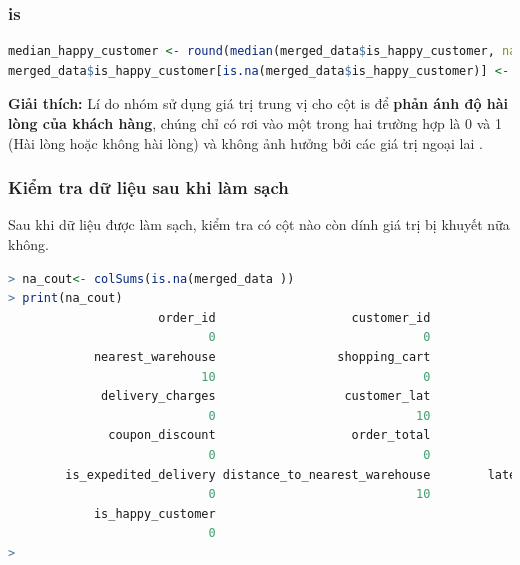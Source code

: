 \subsubsection{is}
\begin{lstlisting}[language=R, caption=Làm tròn trung vị]
median_happy_customer <- round(median(merged_data$is_happy_customer, na.rm = TRUE), digits = 0)
merged_data$is_happy_customer[is.na(merged_data$is_happy_customer)] <- median_happy_customer
\end{lstlisting}
\begin{boxH} 
\textbf{Giải thích:}
    Lí do nhóm sử dụng giá trị trung vị cho cột 
is để \textbf{phản ánh độ hài lòng của khách hàng}, chúng chỉ có rơi vào một trong hai trường hợp là 0 và 1 (Hài lòng hoặc không hài lòng) và không ảnh hưởng bởi các giá trị ngoại lai .
\end{boxH}
\subsubsection{Kiểm tra dữ liệu sau khi làm sạch}
Sau khi dữ liệu được làm sạch, kiểm tra có cột nào còn dính giá trị bị khuyết nữa không.

\begin{lstlisting}[language=R, caption=Kiểm tra dữ liệu bị khuyết sau khi làm sạch]
> na_cout<- colSums(is.na(merged_data ))
> print(na_cout)
                     order_id                   customer_id                          date 
                            0                             0                             0 
            nearest_warehouse                 shopping_cart                   order_price 
                           10                             0                             0 
             delivery_charges                  customer_lat                 customer_long 
                            0                            10                            10 
              coupon_discount                   order_total                        season 
                            0                             0                             0 
        is_expedited_delivery distance_to_nearest_warehouse        latest_customer_review 
                            0                            10                             0 
            is_happy_customer 
                            0 
> 
\end{lstlisting}

